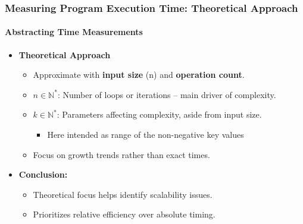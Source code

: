\documentclass[compress,12pt,bookmark]{beamer}
\begin{document}
\begin{frame}
    \frametitle{Measuring Program Execution Time: Theoretical Approach}
    \framesubtitle{Abstracting Time Measurements}

    \begin{itemize}
        \item \textbf{Theoretical Approach}
              \begin{itemize}
                  \item Approximate with \textbf{input size} (n) and \textbf{operation count}.
                  \item $n \in \mathbb{N}^*$: Number of loops or iterations -- main driver of complexity.
                  \item $k \in \mathbb{N}^*$: Parameters affecting complexity, aside from input size.
                        \begin{itemize}
                            \item Here intended as range of the non-negative key values
                        \end{itemize}
                  \item Focus on growth trends rather than exact times.
              \end{itemize}
        \item \textbf{Conclusion:}
              \begin{itemize}
                  \item Theoretical focus helps identify scalability issues.
                  \item Prioritizes relative efficiency over absolute timing.
              \end{itemize}
    \end{itemize}
\end{frame}
\end{document}
